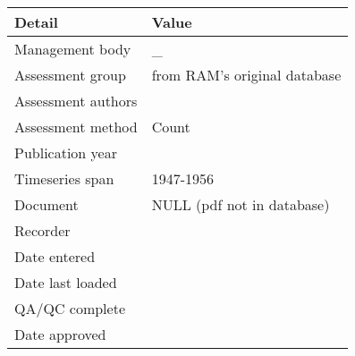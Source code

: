 \begin{table}[htb]
\centering
\begin{tabular}{ll}
\toprule
Detail & Value \\
\midrule
Management body    & \_                           \\
Assessment group   & from RAM's original database \\
Assessment authors &                              \\
Assessment method  & Count                        \\
Publication year   &                              \\
Timeseries span    & 1947-1956                    \\
Document           & NULL (pdf not in database)   \\
Recorder           &                              \\
Date entered       &                              \\
Date last loaded   &                              \\
QA/QC complete     &                              \\
Date approved      &                              \\
\bottomrule
\end{tabular}
\label{tab:assessdet}
\end{table}
